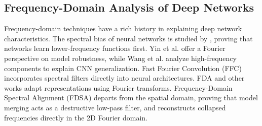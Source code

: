 \documentclass{article}
\begin{document}
\subsection{Frequency-Domain Analysis of Deep Networks}
Frequency-domain techniques have a rich history in explaining deep network characteristics. The spectral bias of neural networks is studied by \cite{rahaman2019spectral}, proving that networks learn lower-frequency functions first. Yin et al. \cite{yin2019fourier} offer a Fourier perspective on model robustness, while Wang et al. \cite{wang2020high} analyze high-frequency components to explain CNN generalization. Fast Fourier Convolution (FFC) \cite{chi2020fast} incorporates spectral filters directly into neural architectures. FDA \cite{yang2020fda} and other works \cite{xu2020learning, ruan2022fourier, huang2023fourier} adapt representations using Fourier transforms. Frequency-Domain Spectral Alignment (FDSA) \cite{visionary2026} departs from the spatial domain, proving that model merging acts as a destructive low-pass filter, and reconstructs collapsed frequencies directly in the 2D Fourier domain.
\end{document}
